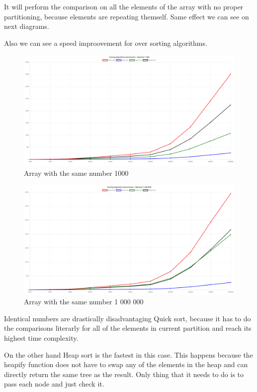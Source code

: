 \documentclass[12pt]{article}
\begin{document}
It will perform the comparison on all the elements of the array with no proper partitioning, because elements are repeating themself. Same effect we can see on next diagrams.

Also we can see a speed improovement for over sorting algorithms.


\begin{figure}[h]
    \centering
    \includegraphics[width=1\textwidth]{iden1000.png}
    \caption{Array with the same number 1000}
    \label{fig:identical1000}
\end{figure}

\begin{figure}[h]
    \centering
    \includegraphics[width=1\textwidth]{iden1000000.png}
    \caption{Array with the same number 1 000 000}
    \label{fig:identical1000000}
\end{figure}

\clearpage
Identical numbers are drastically disadvantaging Quick sort, because it has to 
do the comparisons literarly for all of the elements in current partition and reach its highest 
time complexity. 

On the other hand Heap sort is the fastest in this case. This happens because the heapify function does not 
have to swap any of the elements in the heap and can directly return the same 
tree as the result. Only thing that it needs to do is to pass each node and just check it.
\end{document}

